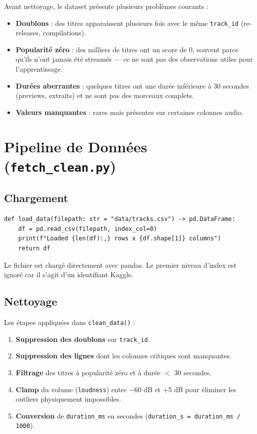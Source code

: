 \documentclass[12pt, a4paper]{article}
\begin{document}
Avant nettoyage, le dataset présente plusieurs problèmes courants :
\begin{itemize}[leftmargin=1.5cm]
  \item \textbf{Doublons} : des titres apparaissent plusieurs fois avec le même
        \texttt{track\_id} (re-releases, compilations).
  \item \textbf{Popularité zéro} : des milliers de titres ont un score de 0, souvent
        parce qu'ils n'ont jamais été streamés — ce ne sont pas des observations utiles
        pour l'apprentissage.
  \item \textbf{Durées aberrantes} : quelques titres ont une durée inférieure à 30
        secondes (previews, extraits) et ne sont pas des morceaux complets.
  \item \textbf{Valeurs manquantes} : rares mais présentes sur certaines colonnes audio.
\end{itemize}

\section{Pipeline de Données (\texttt{fetch\_clean.py})}

\subsection{Chargement}

\begin{codebox}
\begin{lstlisting}
def load_data(filepath: str = "data/tracks.csv") -> pd.DataFrame:
    df = pd.read_csv(filepath, index_col=0)
    print(f"Loaded {len(df):,} rows x {df.shape[1]} columns")
    return df
\end{lstlisting}
\end{codebox}

Le fichier est chargé directement avec pandas. Le premier niveau d'index est ignoré car
il s'agit d'un identifiant Kaggle.

\subsection{Nettoyage}

Les étapes appliquées dans \texttt{clean\_data()} :

\begin{enumerate}[leftmargin=1.5cm]
  \item \textbf{Suppression des doublons} sur \texttt{track\_id}.
  \item \textbf{Suppression des lignes} dont les colonnes critiques sont manquantes.
  \item \textbf{Filtrage} des titres à popularité zéro et à durée \(<\) 30 secondes.
  \item \textbf{Clamp} du volume (\texttt{loudness}) entre −60 dB et +5 dB pour éliminer
        les outliers physiquement impossibles.
  \item \textbf{Conversion} de \texttt{duration\_ms} en secondes
        (\texttt{duration\_s = duration\_ms / 1000}).
\end{enumerate}
\end{document}
